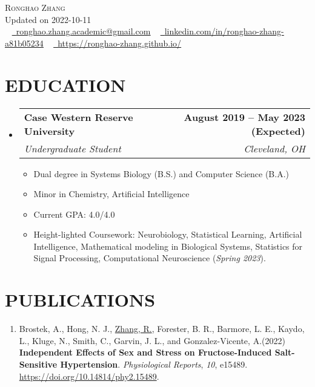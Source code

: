 \documentclass[letterpaper,11pt]{article}
\makeatletter
\newcommand{\resumeItem}[1]{
	\item\small{
		{#1 \vspace{0pt}}
	}
}
\newcommand{\resumeSubheading}[4]{
	\vspace{-2pt}\item
	\begin{tabular*}{1.0\textwidth}[t]{l@{\extracolsep{\fill}}r}
		\textbf{#1} & \textbf{\small #2} \\
		\textit{\small#3} & \textit{\small #4} \\
	\end{tabular*}\vspace{-4pt}
}
\newcommand{\resumeSubHeadingListStart}{\begin{itemize}[leftmargin=0.0in, label={}]}
\newcommand{\resumeSubHeadingListEnd}{\end{itemize}}
\newcommand{\resumeItemListStart}{\begin{itemize}}
\newcommand{\resumeItemListEnd}{\end{itemize}\vspace{-5pt}}
\makeatother
\begin{document}
	
	\begin{center}
		{\Huge \scshape Ronghao Zhang} 
		\\ \vspace{5pt}
		Updated on 2022-10-11
		\\ \vspace{5pt}
		\small \raisebox{-0.1\height} ~ 
		\href{mailto:x@gmail.com}{\raisebox{-0.2\height}\faEnvelope\          \underline{ronghao.zhang.academic@gmail.com}} ~ 
		\href{https://linkedin.com/in//}{\raisebox{-0.2\height}\faLinkedin\     \underline{linkedin.com/in/ronghao-zhang-a81b05234}}  ~
		\href{https://ronghao-zhang.github.io/}{\raisebox{-0.2\height}\faGithub\ \underline{https://ronghao-zhang.github.io/}}
		\vspace{1pt}
	\end{center}
	
	\section{EDUCATION}
	\resumeSubHeadingListStart
	\resumeSubheading
	{Case Western Reserve University}{August 2019 -- May 2023 (Expected)}
	{Undergraduate Student}{Cleveland, OH}
	\resumeItemListStart
	\resumeItem{Dual degree in Systems Biology (B.S.) and Computer Science (B.A.)}
	\resumeItem{Minor in Chemistry, Artificial Intelligence}
	\resumeItem{Current GPA: 4.0/4.0}
	\resumeItem{Height-lighted Coursework: Neurobiology, Statistical Learning, Artificial Intelligence, Mathematical modeling in Biological Systems, Statistics for Signal Processing, Computational Neuroscience (\textit{Spring 2023}).}
	\resumeItemListEnd
	\resumeSubHeadingListEnd
	
	\section{PUBLICATIONS}
	\begin{enumerate}[itemsep=-2pt, parsep=5pt]
		\item Brostek, A., Hong, N. J., \underline{Zhang, R.}, Forester, B. R., Barmore, L. E., Kaydo, L., Kluge, N., Smith, C., Garvin, J. L., and Gonzalez-Vicente, A.(2022) \textbf{Independent Effects of Sex and Stress on Fructose-Induced Salt-Sensitive Hypertension}. \textit{Physiological Reports}, \textit{10}, e15489. \url{https://doi.org/10.14814/phy2.15489}. 
	\end{enumerate}
	
\end{document}
